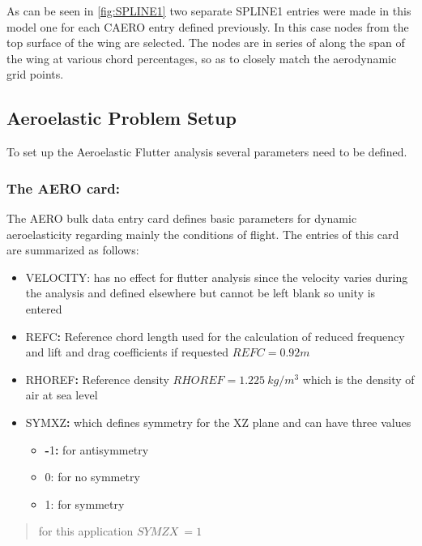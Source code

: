 As can be seen in \autoref{fig:SPLINE1} two separate SPLINE1 entries were made in this model one for each CAERO entry defined previously. In this case nodes from the top surface of the wing are selected. The nodes are in series of along the span of the wing at various chord percentages, so as to closely match the aerodynamic grid points.

\subsection{Aeroelastic Problem Setup}
\label{aeroelastic-problem-setup}

To set up the Aeroelastic Flutter analysis several parameters need to be
defined.

\subsubsection{The AERO card:}

The AERO bulk data entry card defines basic parameters for dynamic
aeroelasticity regarding mainly the conditions of flight. The entries of
this card are summarized as follows:

\begin{itemize}
\item
  VELOCITY: has no effect for flutter analysis since the velocity
  varies during the analysis and defined elsewhere but cannot be left
  blank so unity is entered
\item
  REFC\textbf{:} Reference chord length used for the calculation of
  reduced frequency and lift and drag coefficients if requested
  \(REFC = 0.92m\)
\item
  RHOREF\textbf{:} Reference density \(RHOREF = 1.225\ kg\text{/}m^{3}\)
  which is the density of air at sea level
\item
  SYMXZ\textbf{:} which defines symmetry for the XZ plane and can have
  three values

  \begin{itemize}
  \item
    \textbf{-}1\textbf{:} for antisymmetry
  \item
    0: for no symmetry
  \item
    1: for symmetry
  \end{itemize}
\end{itemize}

\begin{quote}
for this application \(SYMZX\  = 1\)
\end{quote}

